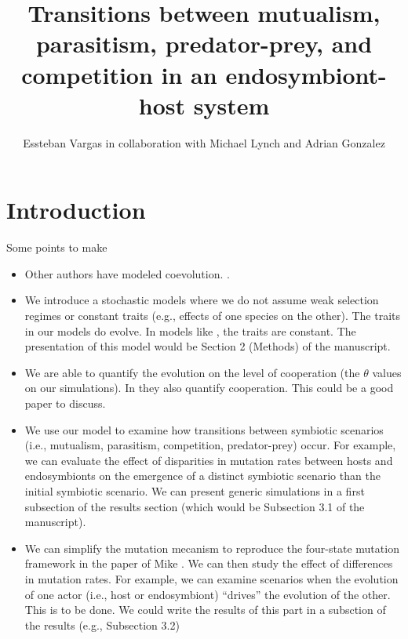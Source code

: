 \documentclass[a4paper]{article}
\title{Transitions between mutualism, parasitism, predator-prey, and competition in an endosymbiont-host system}
\author{Essteban Vargas in collaboration with Michael Lynch and Adrian Gonzalez}
\begin{document}
\maketitle



\begin{abstract}


\end{abstract}




\section{Introduction}\label{sec:intro}

Some points to make

\begin{itemize}
    \item Other authors have modeled coevolution. \cite{gavrilets1998coevolutionary,ito2019joint}. 
    \item We introduce a stochastic models where we do not assume weak selection regimes or constant traits (e.g., effects of one species on the other). The traits in our models do evolve. In models like \cite{gavrilets1998coevolutionary}, the traits are constant. The presentation of this model would be Section 2 (Methods) of the manuscript.
    \item We are able to quantify the evolution on the level of cooperation (the $\theta$ values on our simulations). In \cite{ito2019joint} they also quantify cooperation. This could be a good paper to discuss.
    \item We use our model to examine how transitions between symbiotic scenarios (i.e., mutualism, parasitism, competition, predator-prey) occur. For example, we can evaluate the effect of disparities in mutation rates
          between hosts and endosymbionts on the emergence of a distinct symbiotic scenario than the initial symbiotic scenario. We can present generic simulations in a first subsection of the results section (which would be Subsection 3.1 of the manuscript).
    \item We can simplify the mutation mecanism to reproduce the four-state mutation framework in the paper of Mike \cite{lynch2023mutation}. We can then study the effect of differences in mutation rates. For example, we can examine scenarios when the evolution of one actor (i.e., host or endosymbiont) ``drives'' the evolution of the other. This is to be done.
         We could write the results of this part in a subsction of the results (e.g., Subsection 3.2)
\end{itemize}
\end{document}

